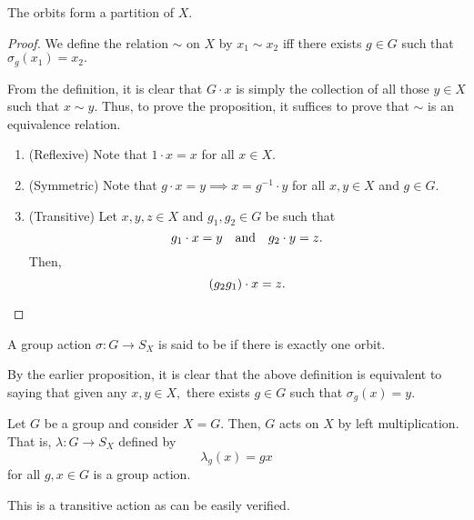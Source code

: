 \begin{prop} \label{prop:orbitspartitionX}
	The orbits form a partition of $X.$
\end{prop}
\begin{proof} 
	We define the relation $\sim$ on $X$ by $x_1 \sim x_2$ iff there exists $g \in G$ such that $\sigma_g(x_1) = x_2.$

	From the definition, it is clear that $G \cdot x$ is simply the collection of all those $y \in X$ such that $x \sim y.$ Thus, to prove the proposition, it suffices to prove that $\sim$ is an equivalence relation. 

	\begin{enumerate}
		\item (Reflexive) Note that $1 \cdot x = x$ for all $x \in X.$
		\item (Symmetric) Note that $g \cdot x = y \implies x = g^{-1} \cdot y$ for all $x, y \in X$ and $g \in G.$
		\item (Transitive) Let $x, y, z \in X$ and $g_1, g_2 \in G$ be such that
		\begin{equation*} 
			g_1 \cdot x = y \quad\text{and}\quad g_2 \cdot y = z.
		\end{equation*}
		Then,
		\begin{equation*} 
			(g_2g_1) \cdot x = z. \qedhere
		\end{equation*}
	\end{enumerate}
\end{proof}

\begin{defn}%
	A group action $\sigma : G \to S_X$ is said to be  if there is exactly one orbit.
\end{defn}

\begin{rem}
	By the earlier proposition, it is clear that the above definition is equivalent to saying that given any $x, y \in X,$ there exists $g \in G$ such that $\sigma_g(x) = y.$
\end{rem}

\begin{ex} \label{ex:regularaction}
	Let $G$ be a group and consider $X = G.$ Then, $G$ acts on $X$ by left multiplication. That is, $\lambda : G \to S_X$ defined by
	\begin{equation*} 
		\lambda_g(x) = gx
	\end{equation*}
	for all $g, x \in G$ is a group action.

	This is a transitive action as can be easily verified.
\end{ex}


